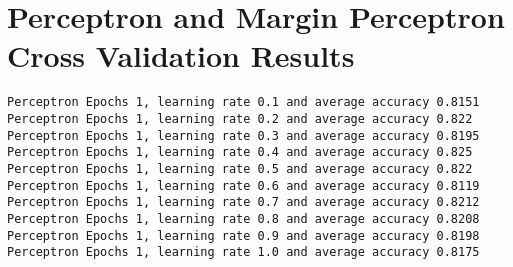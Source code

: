 \section{Perceptron and Margin Perceptron Cross Validation Results}
\begin{Verbatim}[fontsize=\small]
Perceptron Epochs 1, learning rate 0.1 and average accuracy 0.8151
Perceptron Epochs 1, learning rate 0.2 and average accuracy 0.822
Perceptron Epochs 1, learning rate 0.3 and average accuracy 0.8195
Perceptron Epochs 1, learning rate 0.4 and average accuracy 0.825
Perceptron Epochs 1, learning rate 0.5 and average accuracy 0.822
Perceptron Epochs 1, learning rate 0.6 and average accuracy 0.8119
Perceptron Epochs 1, learning rate 0.7 and average accuracy 0.8212
Perceptron Epochs 1, learning rate 0.8 and average accuracy 0.8208
Perceptron Epochs 1, learning rate 0.9 and average accuracy 0.8198
Perceptron Epochs 1, learning rate 1.0 and average accuracy 0.8175


\end{Verbatim}
